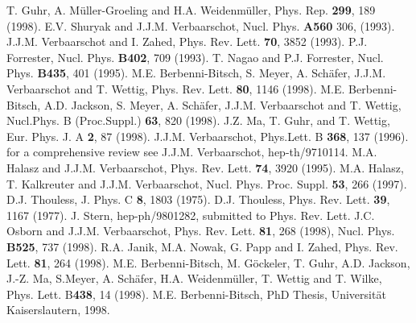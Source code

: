 \begin{references}
        T. Guhr, A. M\"uller-Groeling and  H.A. Weidenm\"uller,
                        Phys. Rep. {\bf 299}, 189 (1998).
     E.V. Shuryak and  J.J.M. Verbaarschot,
                        Nucl. Phys. {\bf A560} 306, (1993).
     J.J.M. Verbaarschot and I. Zahed,
                        Phys. Rev. Lett. {\bf 70}, 3852 (1993).
        P.J. Forrester, Nucl. Phys. {\bf B402}, 709 (1993).
       T. Nagao and P.J. Forrester, Nucl. Phys. {\bf B435},
                        401 (1995).
     M.E. Berbenni-Bitsch, S. Meyer, A. Sch\"afer,
                        J.J.M. Verbaarschot and T. Wettig,
                        Phys. Rev. Lett. {\bf 80}, 1146 (1998).
     M.E. Berbenni-Bitsch, A.D. Jackson, S. Meyer,
                        A. Sch\"afer, J.J.M. Verbaarschot and T. Wettig,
                        Nucl.Phys. B (Proc.Suppl.) {\bf 63}, 820 (1998).
          J.Z. Ma, T. Guhr, and T. Wettig,
                        Eur. Phys. J. A {\bf 2}, 87 (1998).
     J.J.M. Verbaarschot, Phys.Lett. B {\bf 368},
                        137 (1996).
     for a comprehensive review see J.J.M. Verbaarschot,
                        hep-th/9710114.
      M.A. Halasz and J.J.M. Verbaarschot,
                        Phys. Rev. Lett. {\bf 74}, 3920 (1995).
      M.A. Halasz, T. Kalkreuter and J.J.M. Verbaarschot,
                        Nucl. Phys. Proc. Suppl. {\bf 53}, 266 (1997).
        D.J. Thouless, J. Phys. C {\bf 8}, 1803 (1975).
        D.J. Thouless, Phys. Rev. Lett. {\bf 39}, 1167 (1977).
       J. Stern, hep-ph/9801282, submitted to
                        Phys. Rev. Lett.
      J.C. Osborn and J.J.M. Verbaarschot,
                        Phys. Rev. Lett. {\bf 81}, 268 (1998),
                        Nucl. Phys. {\bf B525}, 737 (1998).
       R.A. Janik, M.A. Nowak, G. Papp and I. Zahed,
                        Phys. Rev. Lett. {\bf 81}, 264 (1998).
      M.E. Berbenni-Bitsch, M. G\"ockeler, T. Guhr,
                        A.D. Jackson, J.-Z. Ma, S.Meyer, A. Sch\"afer,
                        H.A. Weidenm\"uller, T. Wettig and T. Wilke,
                        Phys. Lett. B{\bf 438}, 14 (1998).
         M.E. Berbenni-Bitsch, PhD Thesis, Universit\"at
                        Kaiserslautern, 1998.

\end{references}

